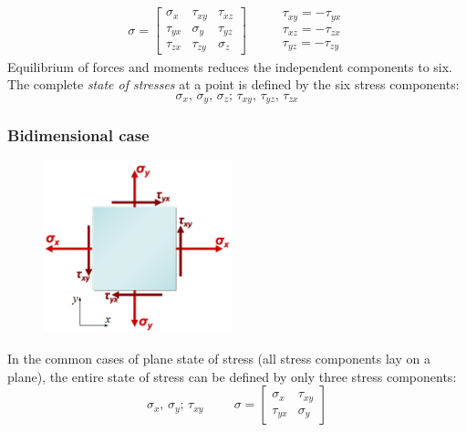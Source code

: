 \documentclass[class=report, crop=false, 12pt,a4paper]{standalone}
\begin{document}
\begin{align}
    \sigma = \begin{bmatrix}
        \sigma_x & \tau_{xy} & \tau_{xz}\\
        \tau_{yx} & \sigma_y & \tau_{yz}\\
        \tau_{zx} & \tau_{zy} & \sigma_z
    \end{bmatrix} \hspace{1cm}
    \begin{array}{l}
        \tau_{xy} = -\tau_{yx}\\
        \tau_{xz} = -\tau_{zx}\\
        \tau_{yz} = -\tau_{zy}
    \end{array}
\end{align}
Equilibrium of forces and moments reduces the independent components to six. The complete \textit{state of stresses} at a point is defined by the six stress components:
\begin{equation}
    \sigma_x, \, \sigma_y, \, \sigma_z; \, \tau_{xy}, \, \tau_{yz}, \, \tau_{zx}
\end{equation}
\subsubsection{Bidimensional case}
\begin{figure}[H]
    \centering
    \includegraphics[height = 5cm]{../img/diagram43.png}
    \caption{}
\end{figure}
In the common cases of plane state of stress (all stress components lay on a plane), the entire state of stress can be defined by only three stress components:
\begin{equation}
    \sigma_x, \, \sigma_y; \, \tau_{xy} \hspace{1cm} \sigma = \begin{bmatrix}
        \sigma_x & \tau_{xy}\\
        \tau_{yx} & \sigma_y
    \end{bmatrix}
\end{equation}
\end{document}
